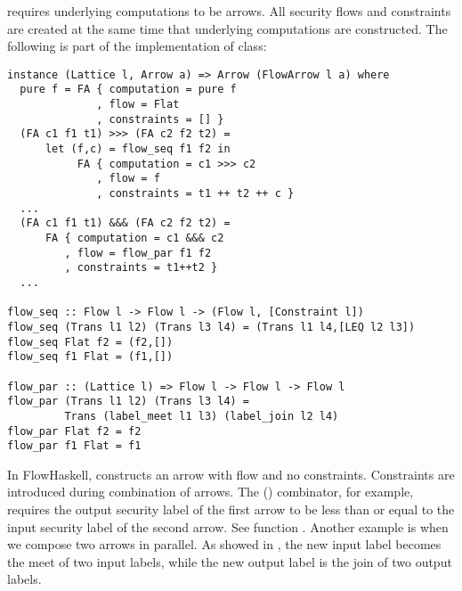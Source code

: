  requires underlying computations to be arrows. All security flows and
constraints are created at the same time that underlying computations are constructed.
The following is part of the implementation of  class:
\begin{verbatim}
instance (Lattice l, Arrow a) => Arrow (FlowArrow l a) where
  pure f = FA { computation = pure f
              , flow = Flat
              , constraints = [] }
  (FA c1 f1 t1) >>> (FA c2 f2 t2) =
      let (f,c) = flow_seq f1 f2 in
           FA { computation = c1 >>> c2
              , flow = f
              , constraints = t1 ++ t2 ++ c }
  ...
  (FA c1 f1 t1) &&& (FA c2 f2 t2) = 
      FA { computation = c1 &&& c2
         , flow = flow_par f1 f2
         , constraints = t1++t2 }
  ...

flow_seq :: Flow l -> Flow l -> (Flow l, [Constraint l])
flow_seq (Trans l1 l2) (Trans l3 l4) = (Trans l1 l4,[LEQ l2 l3])
flow_seq Flat f2 = (f2,[])
flow_seq f1 Flat = (f1,[])

flow_par :: (Lattice l) => Flow l -> Flow l -> Flow l
flow_par (Trans l1 l2) (Trans l3 l4) = 
         Trans (label_meet l1 l3) (label_join l2 l4)
flow_par Flat f2 = f2
flow_par f1 Flat = f1
\end{verbatim}
In FlowHaskell,  constructs an arrow with  flow and no constraints.
Constraints are introduced during combination of arrows. The (\arrowop{>}) combinator,
for example, requires the output security label of the first arrow to be less than or equal to
the input security label of the second arrow. See function .
Another example is when we compose two arrows in parallel. As showed in
, the new input label becomes the meet of two input labels, while the new output label is
the join of two output labels.


